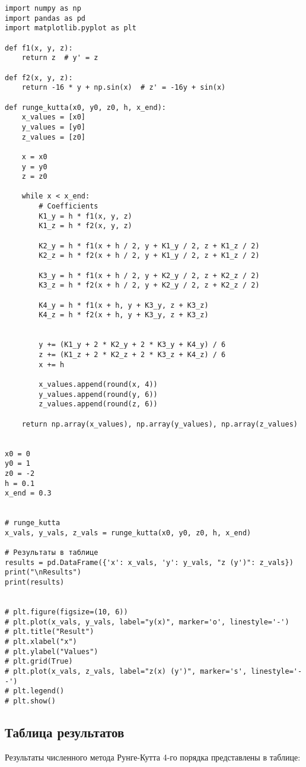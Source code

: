 \documentclass[a4paper,12pt]{article}
\begin{document}
\begin{lstlisting}
import numpy as np
import pandas as pd
import matplotlib.pyplot as plt

def f1(x, y, z):
    return z  # y' = z

def f2(x, y, z):
    return -16 * y + np.sin(x)  # z' = -16y + sin(x)

def runge_kutta(x0, y0, z0, h, x_end):
    x_values = [x0]
    y_values = [y0]
    z_values = [z0]

    x = x0
    y = y0
    z = z0

    while x < x_end:
        # Coefficients
        K1_y = h * f1(x, y, z)
        K1_z = h * f2(x, y, z)

        K2_y = h * f1(x + h / 2, y + K1_y / 2, z + K1_z / 2)
        K2_z = h * f2(x + h / 2, y + K1_y / 2, z + K1_z / 2)

        K3_y = h * f1(x + h / 2, y + K2_y / 2, z + K2_z / 2)
        K3_z = h * f2(x + h / 2, y + K2_y / 2, z + K2_z / 2)

        K4_y = h * f1(x + h, y + K3_y, z + K3_z)
        K4_z = h * f2(x + h, y + K3_y, z + K3_z)


        y += (K1_y + 2 * K2_y + 2 * K3_y + K4_y) / 6
        z += (K1_z + 2 * K2_z + 2 * K3_z + K4_z) / 6
        x += h

        x_values.append(round(x, 4))
        y_values.append(round(y, 6))
        z_values.append(round(z, 6))

    return np.array(x_values), np.array(y_values), np.array(z_values)


x0 = 0
y0 = 1
z0 = -2
h = 0.1
x_end = 0.3


# runge_kutta
x_vals, y_vals, z_vals = runge_kutta(x0, y0, z0, h, x_end)

# Результаты в таблице
results = pd.DataFrame({'x': x_vals, 'y': y_vals, "z (y')": z_vals})
print("\nResults")
print(results)


# plt.figure(figsize=(10, 6))
# plt.plot(x_vals, y_vals, label="y(x)", marker='o', linestyle='-')
# plt.title("Result")
# plt.xlabel("x")
# plt.ylabel("Values")
# plt.grid(True)
# plt.plot(x_vals, z_vals, label="z(x) (y')", marker='s', linestyle='--')
# plt.legend()
# plt.show()

\end{lstlisting}

\subsection*{Таблица результатов}
Результаты численного метода Рунге-Кутта 4-го порядка представлены в таблице:
\end{document}
